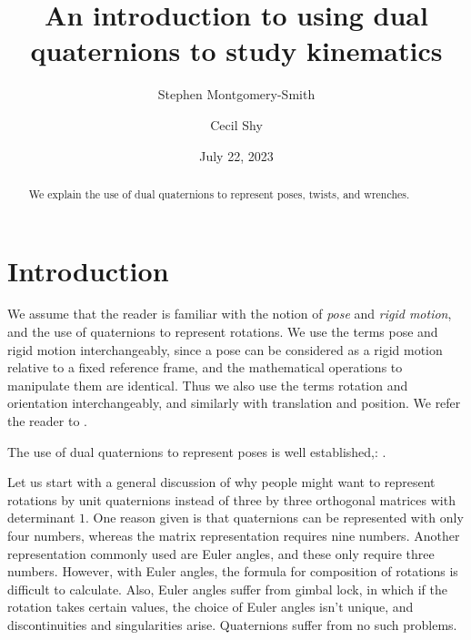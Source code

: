 \documentclass[reqno,12pt]{amsart}
\makeatletter
\def\blfootnote{\gdef\@thefnmark{}\@footnotetext}
\makeatother
\begin{document}
\title{An introduction to using dual quaternions to study kinematics}

\author{Stephen Montgomery-Smith}
\address{Department of Mathematics, University of Missouri, Columbia, MO 65211.}

\author{Cecil Shy}
\address{Johnson Space Center, 2101 E.~NASA Pkwy, Houston, TX 77058.}

\date{July 22, 2023}

\begin{abstract}
We explain the use of dual quaternions to represent poses, twists, and wrenches. \end{abstract}

\maketitle


\section{Introduction}

We assume that the reader is familiar with the notion of \emph{pose} and \emph{rigid motion}, and the use of quaternions to represent rotations.  We use the terms pose and rigid motion interchangeably, since a pose can be considered as a rigid motion relative to a fixed reference frame, and the mathematical operations to manipulate them are identical.  Thus we also use the terms rotation and orientation interchangeably, and similarly with translation and position.  We refer the reader to \cite{bottema-et-al,gallardo-alvarado,selig-book,spong-et-al}.

The use of dual quaternions to represent poses is well established,: \cite{adorno,agrawal,clifford,dooley-et-al,han-et-al,kavan-et-al,kavan-et-al-2,kenwright,kussaba-et-al,perez-et-al,schilling1,schilling2,silva-et-al,wang-et-al,yang-et-al}.

Let us start with a general discussion of why people might want to represent rotations by unit quaternions instead of three by three orthogonal matrices with determinant $1$.  One reason given is that quaternions can be represented with only four numbers, whereas the matrix representation requires nine numbers.  Another representation commonly used are Euler angles, and these only require three numbers.  However, with Euler angles, the formula for composition of rotations is difficult to calculate.  Also, Euler angles suffer from gimbal lock, in which if the rotation takes certain values, the choice of Euler angles isn't unique, and discontinuities and singularities arise.  Quaternions suffer from no such problems.
\end{document}
